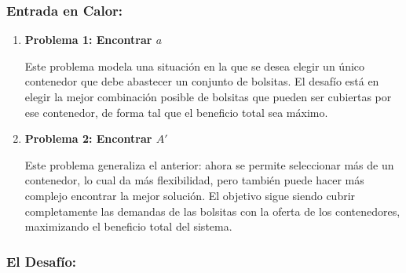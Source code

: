 \documentclass[a4paper,12pt]{article}
\begin{document}
\subsubsection*{Entrada en Calor:}

\begin{enumerate}
    \item \textbf{Problema 1: Encontrar $a$ }
    
     Este problema modela una situación en la que se desea elegir un único contenedor que debe abastecer un conjunto de bolsitas. El desafío está en elegir la mejor combinación posible de bolsitas que pueden ser cubiertas por ese contenedor, de forma tal que el beneficio total sea máximo.
    
    \item \textbf{Problema 2: Encontrar $A'$ }
    
    Este problema generaliza el anterior: ahora se permite seleccionar más de un contenedor, lo cual da más flexibilidad, pero también puede hacer más complejo encontrar la mejor solución. El objetivo sigue siendo cubrir completamente las demandas de las bolsitas con la oferta de los contenedores, maximizando el beneficio total del sistema.
    
\end{enumerate}

\subsubsection*{El Desafío:}
\end{document}
